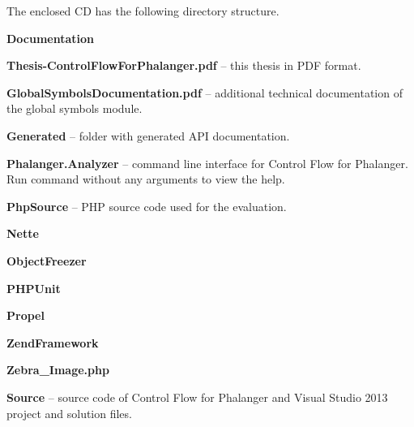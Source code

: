 
The enclosed CD has the following directory structure.

\begin{itemize*}
    \item \textbf{Documentation}
        \begin{itemize*}
            \item \textbf{Thesis-ControlFlowForPhalanger.pdf} -- this thesis in PDF format.
            \item \textbf{GlobalSymbolsDocumentation.pdf} -- additional technical documentation 
            of the global symbols module.
            \item \textbf{Generated} -- folder with generated API documentation.
        \end{itemize*}
    \item \textbf{Phalanger.Analyzer} -- command line interface for Control Flow for Phalanger. 
        Run command  without any arguments to view the help.
    \item \textbf{PhpSource} -- PHP source code used for the evaluation.
        \begin{itemize*}
            \item \textbf{Nette}
            \item \textbf{ObjectFreezer}
            \item \textbf{PHPUnit}
            \item \textbf{Propel}
            \item \textbf{ZendFramework}            
            \item \textbf{Zebra\_Image.php}
        \end{itemize*}
    \item \textbf{Source} -- source code of Control Flow for Phalanger and 
    Visual Studio 2013 project and solution files.
\end{itemize*}